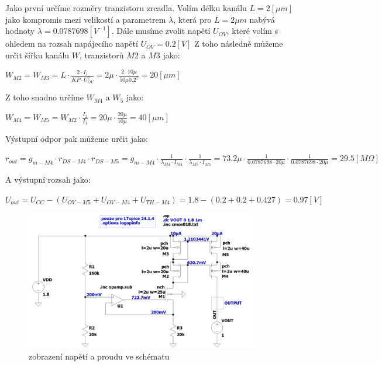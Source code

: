 Jako první určíme rozměry tranzistoru zrcadla.
Volím délku kanálu \(L = 2 [\mu m]\) jako kompromis mezi velikostí a parametrem \(\lambda\), která pro \(L = 2 \mu m\) nabývá hodnoty \(\lambda = 0.0787698 [V^{-1}]\).
Dále musíme zvolit napětí \(U_{OV}\), které volím s ohledem na rozsah napájecího napětí \(U_{OV} = 0.2 [V]\)
Z toho následně můžeme určit šířku kanálu \(W\), tranzistorů \(M2\) a \(M3\) jako:

\begin{center}
    \large
    \(
        W_{M2} = W_{M3} = L \cdot \frac{2 \cdot I_1}{KP \cdot U_{OV}^2} = 2\mu \cdot \frac{2 \cdot 10\mu}{50\mu 0.2^2} = 20 [\mu m]
    \)
\end{center}

Z toho snadno určíme \(W_{M4}\) a \(W_{5}\) jako:

\begin{center}
    \large
    \(
        W_{M4} = W_{M5} = W_{M2} \cdot \frac{I_2}{I_1} = 20\mu \cdot \frac{20\mu}{10\mu} = 40 [\mu m]
    \)
\end{center}

Výstupní odpor pak můžeme určit jako:

\begin{center}
    \large
    \(
        r_{out} = g_{m-M4} \cdot r_{DS-M4} \cdot r_{DS-M5} = g_{m-M4} \cdot \frac{1}{\lambda_{M4}\cdot I_{M4}} \cdot \frac{1}{\lambda_{M5}\cdot I_{M5}} = 73.2\mu \cdot \frac{1}{0.0787698 \cdot 20\mu} \cdot \frac{1}{0.0787698 \cdot 20\mu} = 29.5 [M \Omega]
    \)
\end{center}

A výstupní rozsah jako:

\begin{center}
    \large
    \(
        U_{out} = U_{CC} - (U_{OV-M5} + U_{OV-M4} + U_{TH-M4}) = 1.8 - (0.2+0.2+0.427) = 0.97 [V]
    \)
\end{center}

\vspace{10mm}
\begin{figure}[h!]
    \centering
    \includegraphics[width=0.9\textwidth]{text/img/KPZ-op-sch.png}
    \caption{\label{fig:KPZ-op-sch} zobrazení napětí a proudu ve schématu}
\end{figure}

